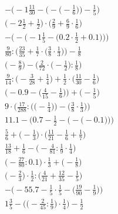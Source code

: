 \documentclass[8pt]{article}
\begin{document}
\begin{align}
-\bigg(-1\frac{11}{30} - \Big(-\big(-\frac{1}{6}\big)\Big) - \frac{1}{5}\bigg) \\
\big(-2\frac{1}{2} + \frac{1}{2}\big) \cdot \big(\frac{2}{9} + \frac{6}{9} \cdot \frac{1}{6}\big) \\
-\bigg(-\Big(-1\frac{1}{5} - \big(0.2 \cdot \frac{1}{2} + 0.1\big)\Big)\bigg) \\
\frac{9}{80} : \Big(\frac{23}{35} + \frac{1}{7} \cdot \big(\frac{3}{8} \cdot \frac{1}{3}\big)\Big) - \frac{1}{8} \\
\Big(-\frac{8}{9}\Big) - \Big(\frac{2}{72} \cdot \big(-\frac{1}{2}\big) : \frac{1}{8}\Big) \\
\frac{9}{14} : \big(-\frac{3}{28} + \frac{1}{4}\big) + \frac{1}{2} \cdot \big(\frac{11}{30} - \frac{1}{6}\big) \\
\Big(-0.9 - \big(\frac{4}{15} - \frac{1}{6}\big)\Big) + \Big(-\frac{1}{5}\Big) \\
9 \cdot \bigg(\frac{17}{288} : \Big(\big(-\frac{1}{4}\big)\Big) - \Big(\frac{3}{8} \cdot \frac{1}{3}\Big)\bigg) \\
11.1 - \bigg(0.7 - \frac{1}{2} - \Big(-\big(-0.1\big)\Big)\bigg) \\
\frac{5}{6} + \big(-\frac{1}{3}\big) \cdot \big(\frac{11}{21} - \frac{1}{6} + \frac{1}{7}\big) \\
\frac{13}{18} + \frac{1}{6} - \big(-\frac{4}{81} : \frac{1}{9} \cdot \frac{1}{4}\big) \\
\big(-\frac{27}{80} : 0.1\big) \cdot \frac{1}{3} + \big(-\frac{1}{8}\big) \\
\big(-\frac{2}{3}\big) \cdot \frac{1}{2} : \big(\frac{4}{21} + \frac{12}{35} - \frac{1}{5}\big) \\
-\Big(-55.7 - \frac{1}{5} \cdot \frac{1}{5} - \big(\frac{19}{90} - \frac{1}{9}\big)\Big) \\
1\frac{3}{5} - \Big(\big(-\frac{2}{45} : \frac{1}{9}\big) \cdot \frac{1}{4}\Big) - \frac{1}{2}
\end{align}
\end{document}
